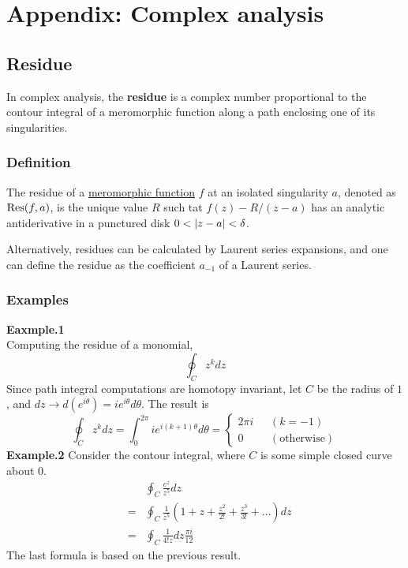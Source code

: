 \chapter{Appendix: Complex analysis}

\section{Residue}
In complex analysis, the \textbf{residue} is a complex number proportional to the contour integral of a meromorphic function along a path enclosing one of its singularities.

\subsection{Definition}
The residue of a \href{https://en.wikipedia.org/wiki/Meromorphic_function}{meromorphic function} $f$ at an isolated singularity $a$, denoted as $\Res(f,a)$, is the unique value $R$ such tat $f(z)-R/(z-a)$ has an analytic antiderivative in a punctured disk $0<\abs{z-a}<\delta$.

Alternatively, residues can be calculated by Laurent series expansions, and one can define the residue as the coefficient $a_{-1}$ of a Laurent series.

\subsection{Examples}
\textbf{Eaxmple.1}\\
Computing the residue of a monomial,
\begin{equation*}
  \oint_C z^k dz
\end{equation*}
Since path integral computations are homotopy invariant, let $C$ be the radius of $1$, and $dz \to d(e^{i\theta}) = ie^{i\theta} d\theta$.
The result is
\begin{equation*}
  \oint_C z^k dz = \int_0^{2\pi} i e^{i(k+1)\theta} d\theta =
  \begin{cases}
    2\pi i ~ ~ ~ &(k=-1) \\
    0 ~ ~ ~ &(\mathrm{otherwise})
  \end{cases}
\end{equation*}
\textbf{Example.2}
Consider the contour integral, where $C$ is some simple closed curve about $0$.
\begin{eqnarray*}
  &&\oint_C \frac{e^z}{z^5}dz  \\
  &=&\oint_C \frac{1}{z^5}(1+z+\frac{z^2}{2!}+\frac{z^3}{3!}+\dots)dz \\
  &=& \oint_C \frac{1}{4! z} dz \frac{\pi i}{12}
\end{eqnarray*}
The last formula is based on the previous result.


